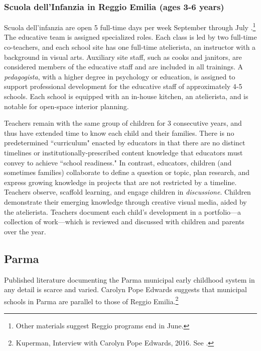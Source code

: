 \documentclass[11pt]{article}
\begin{document}
\subsubsection{Scuola dell'Infanzia in Reggio Emilia (ages 3-6 years)} 
Scuola dell'infanzia are open 5 full-time days per week September through July \citep{Giudici-Nicolosi_2014_Reggio-Approach}.\footnote{Other materials suggest Reggio programs end in June.} The educative team is assigned specialized roles. Each class is led by two full-time co-teachers, and each school site has one full-time atelierista, an instructor with a background in visual arts. Auxiliary site staff, such as cooks and janitors, are considered members of the educative staff and are included in all trainings. A \textit{pedagogista}, with a higher degree in psychology or education, is assigned to support professional development for the educative staff of approximately 4-5 schools. Each school is equipped with an in-house kitchen, an atelierista, and is notable for open-space interior planning.  

Teachers remain with the same group of children for 3 consecutive years, and thus have extended time to know each child and their families. There is no predetermined ``curriculum" enacted by educators in that there are no distinct timelines or institutionally-prescribed content knowledge that educators must convey to achieve ``school readiness." In contrast, educators, children (and sometimes families) collaborate to define a question or topic, plan research, and express growing knowledge in projects that are not restricted by a timeline. Teachers observe, scaffold learning, and engage children in \textit{discussione}. Children demonstrate their emerging knowledge through creative visual media, aided by the atelierista. Teachers document each child's development in a portfolio---a collection of work---which is reviewed and discussed with children and parents over the year. 

\subsection{Parma}
Published literature documenting the Parma municipal early childhood system in any detail is scarce and varied. Carolyn Pope Edwards suggests that municipal schools in Parma are parallel to those of Reggio Emilia.\footnote{Kuperman, Interview with Carolyn Pope Edwards, 2016. See \citet{edwards1998hundred}.} 
\end{document}
